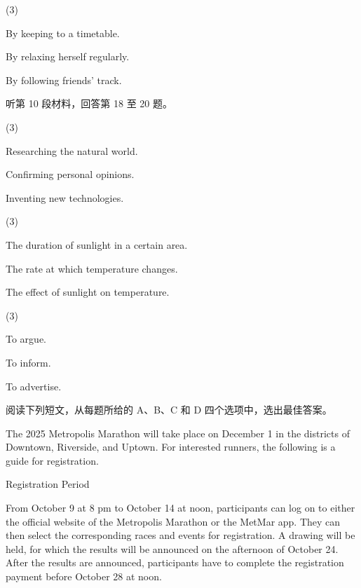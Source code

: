 \documentclass{英语试卷}
\begin{document}
\begin{choices}(3)
  \item By keeping to a timetable.
  \item By relaxing herself regularly.
  \item By following friends' track.
\end{choices}
\par 听第 10 段材料，回答第 18 至 20 题。\par
{}
\begin{choices}(3)
  \item Researching the natural world.
  \item Confirming personal opinions.
  \item Inventing new technologies.
\end{choices}
\begin{choices}(3)
  \item The duration of sunlight in a certain area.
  \item The rate at which temperature changes.
  \item The effect of sunlight on temperature.
\end{choices}
\begin{choices}(3)
  \item To argue.
  \item To inform.
  \item To advertise.
\end{choices}
\par 阅读下列短文，从每题所给的 A、B、C 和 D 四个选项中，选出最佳答案。\par
{}
\par The 2025 Metropolis Marathon will take place on December 1 in the districts of Downtown, Riverside, and Uptown. For interested runners, the following is a guide for registration.\par
\par Registration Period\par
\par From October 9 at 8 pm to October 14 at noon, participants can log on to either the official website of the Metropolis Marathon or the MetMar app. They can then select the corresponding races and events for registration. A drawing will be held, for which the results will be announced on the afternoon of October 24. After the results are announced, participants have to complete the registration payment before October 28 at noon.\par
\end{document}
